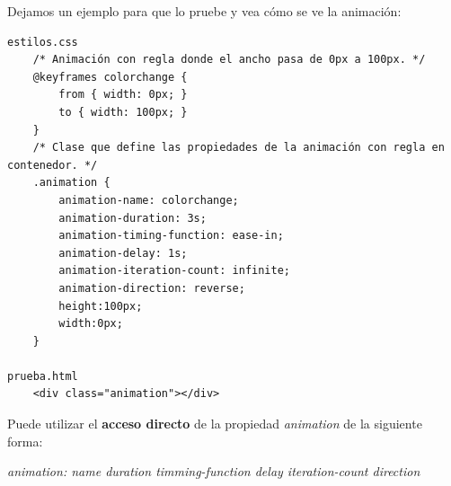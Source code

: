Dejamos un ejemplo para que lo pruebe y vea cómo se ve la animación:
\begin{lstlisting}
estilos.css
    /* Animación con regla donde el ancho pasa de 0px a 100px. */
    @keyframes colorchange {
        from { width: 0px; }
        to { width: 100px; }
    }
    /* Clase que define las propiedades de la animación con regla en contenedor. */
    .animation {
        animation-name: colorchange;
        animation-duration: 3s;
        animation-timing-function: ease-in;
        animation-delay: 1s;
        animation-iteration-count: infinite;
        animation-direction: reverse;
        height:100px;
        width:0px;
    }

prueba.html
    <div class="animation"></div>
\end{lstlisting}

Puede utilizar el \textbf{acceso directo} de la propiedad \textit{animation} de la siguiente forma:
\begin{center}
    \textit{animation: name duration timming-function delay iteration-count direction}
\end{center}
